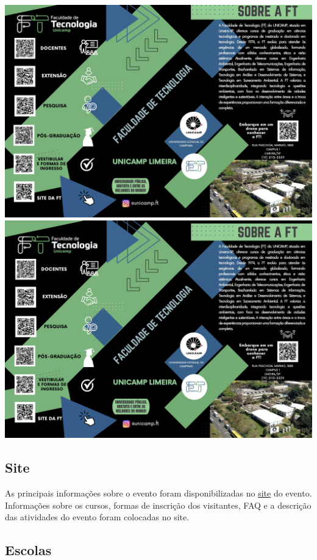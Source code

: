 \documentclass[
  letterpaper,
  DIV=11,
  numbers=noendperiod]{scrreprt}
\begin{document}
\includegraphics[width=0.9\linewidth,height=\textheight,keepaspectratio]{planejamento/folder-1.jpg}
\includegraphics[width=0.9\linewidth,height=\textheight,keepaspectratio]{planejamento/folder-2.jpg}

\subsection{Site}\label{site}

As principais informações sobre o evento foram disponibilizadas no
\href{https://wordpress.ft.unicamp.br/ftpa/}{site} do evento.
Informações sobre os cursos, formas de inscrição dos visitantes, FAQ e a
descrição das atividades do evento foram colocadas no site.

\subsection{Escolas}\label{escolas}
\end{document}

